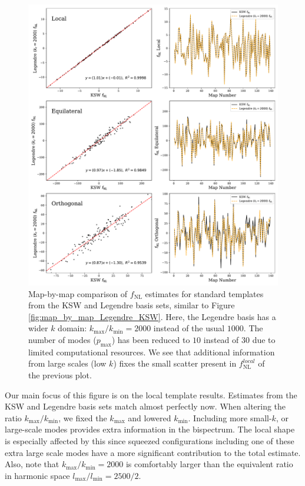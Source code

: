 \begin{figure}[htbp!] 
	\centering    
	\includegraphics[width=\textwidth]{map_by_map_Legendre_KSW_k_ratio_2000.pdf}
	\caption{Map-by-map comparison of $f_\text{NL}$ estimates for standard templates from the KSW and Legendre basis sets, similar to Figure \ref{fig:map_by_map_Legendre_KSW}. Here, the Legendre basis has a wider $k$ domain: $k_\text{max}/k_\text{min} = 2000$ instead of the usual $1000$. The number of modes ($p_\text{max}$) has been reduced to $10$ instead of $30$ due to limited computational resources. We see that additional information from large scales (low $k$) fixes the small scatter present in $f_\text{NL}^{local}$ of the previous plot.}
	\label{fig:map_by_map_Legendre_KSW_k_ratio_2000}
\end{figure}

Our main focus of this figure is on the local template results. Estimates from the KSW and Legendre basis sets match almost perfectly now. When altering the ratio $k_\text{max}/k_\text{min}$, we fixed the $k_\text{max}$ and lowered $k_\text{min}$. Including more small-$k$, or large-scale modes provides extra information in the bispectrum. The local shape is especially affected by this since squeezed configurations including one of these extra large scale modes have a more significant contribution to the total estimate. Also, note that $k_\text{max} / k_\text{min} = 2000$ is comfortably larger than the equivalent ratio in harmonic space $l_\text{max} / l_\text{min} = 2500 / 2$.

